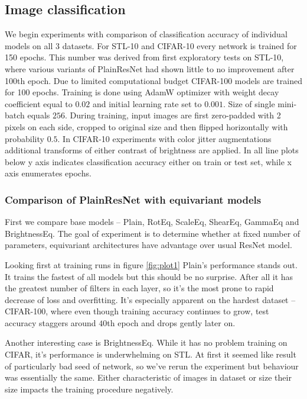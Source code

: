 \newpage










\subsection{Image classification}
    We begin experiments with comparison of classification accuracy of
    individual models on all 3 datasets. For STL-10 and CIFAR-10 every network
    is trained for 150 epochs. This number was derived from first exploratory
    tests on STL-10, where various variants of PlainResNet had shown little to
    no improvement after 100th epoch. Due to limited computational budget
    CIFAR-100 models are trained for 100 epochs. Training is done using AdamW
    optimizer \cite{adamw} with weight decay coefficient equal to $0.02$ and
    initial learning rate set to $0.001$. Size of single mini-batch equals
    $256$. During training, input images are first zero-padded with 2 pixels
    on each side, cropped to original size and then flipped horizontally with
    probability $0.5$. In CIFAR-10 experiments with color jitter augmentations
    additional transforms of either contrast of brightness are applied.
    In all line plots below y axis indicates classification accuracy either on
    train or test set, while x axis enumerates epochs.

    \subsubsection*{Comparison of PlainResNet with equivariant models}
    First we compare base models -- Plain, RotEq, ScaleEq, ShearEq, GammaEq and
    BrightnessEq. The goal of experiment is to determine whether at fixed number
    of parameters, equivariant
    architectures have advantage over usual ResNet model.

    Looking first at
    training runs in figure \ref{fig:plot1} Plain's performance stands out.
    It trains the fastest of all models but this should be no surprise. After
    all it has the greatest number of filters in each layer, so it's the most
    prone to rapid decrease of loss and overfitting. It's especially apparent on
    the hardest dataset --
    CIFAR-100, where even though training accuracy continues to grow, test
    accuracy staggers around $40$th epoch and drops gently later on.

    Another interesting case is BrightnessEq. While it has no problem training
    on CIFAR, it's performance is underwhelming on STL. At first it seemed like
    result of particularly bad seed of network, so we've rerun the experiment
    but behaviour was essentially the same. Either characteristic of images in
    dataset or size their size impacts the training procedure negatively.


